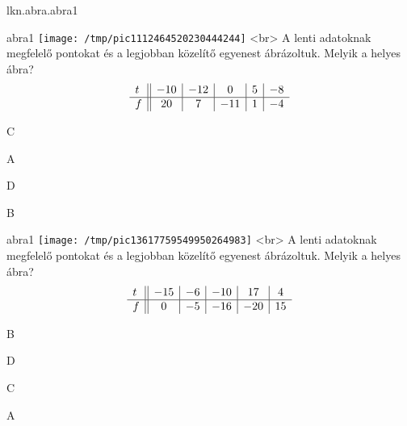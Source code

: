 \documentclass[12pt]{article}
\begin{document}
\begin{quiz}{lkn.abra.abra1}
\begin{multi}{abra1}
\texttt{[image: /tmp/pic1112464520230444244]}
<br>
A lenti adatoknak megfelelő pontokat és a 
legjobban közelítő egyenest ábrázoltuk. Melyik a helyes ábra?
$$\begin{array}{l ||c|c|c|c|c}t&-10&-12&0&5&-8\\ \hline f&20&7&-11&1&-4 \\ \end{array}$$
  \item* C
    \item  A
    \item  D
    \item  B
    \end{multi}
    

\begin{multi}{abra1}
\texttt{[image: /tmp/pic13617759549950264983]}
<br>
A lenti adatoknak megfelelő pontokat és a 
legjobban közelítő egyenest ábrázoltuk. Melyik a helyes ábra?
$$\begin{array}{l ||c|c|c|c|c}t&-15&-6&-10&17&4\\ \hline f&0&-5&-16&-20&15 \\ \end{array}$$
  \item* B
    \item  D
    \item  C
    \item  A
    \end{multi}\end{quiz}
\end{document}
